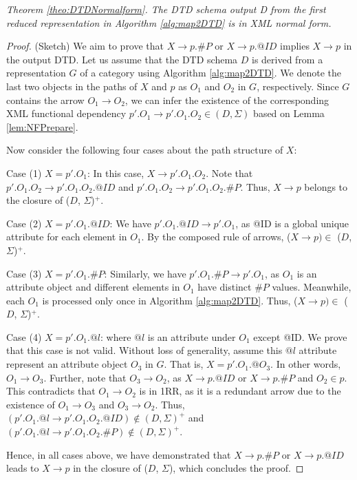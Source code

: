 \noindent \textit{Theorem \ref{theo:DTDNormalform}. The DTD schema output D from the first reduced representation in Algorithm \ref{alg:map2DTD}  is in XML normal form.}


\begin{proof}
(Sketch) We aim to prove that $X \to p.\#P$ or $X \to p.@ID$ implies $X \to p$ in the output DTD.
Let us assume that the DTD schema $D$ is derived from a representation $G$ of a category using Algorithm \ref{alg:map2DTD}. We denote the last two objects in the paths of $X$ and $p$ as $O_1$ and $O_2$ in $G$, respectively. Since $G$ contains the arrow $O_1 \to O_2$, we can infer the existence of the corresponding XML functional dependency $p'.O_1 \to p'.O_1.O_2 \in (D, \Sigma)$ based on Lemma \ref{lem:NFPrepare}.

Now consider the following four cases about the path structure of $X$:


Case (1) $X= p'.O_1$: In this case, $X \to p'.O_1.O_2$. Note that  $p'.O_1.O_2 \to p'.O_1.O_2.@ID$ and  $p'.O_1.O_2 \to p'.O_1.O_2.\#P$. Thus, $X \to p$ belongs to the closure of ($D$, $\Sigma$)$^+$.

Case (2) $X= p'.O_1.@ID$: We have $p'.O_1.@ID \to p'.O_1$, as @ID is a global unique attribute for each element in $O_1$. By the composed rule of arrows,  ($X \to p) \in$ ($D$, $\Sigma$)$^+$.

Case (3) $X= p'.O_1.\#P$: Similarly, we have $ p'.O_1.\#P \to p'.O_1$, as $O_1$ is an attribute object and  different elements in $O_1$ have distinct \#$P$ values. Meanwhile, each $O_1$ is processed only once in Algorithm \ref{alg:map2DTD}. Thus, ($X \to p) \in$ ($D$, $\Sigma$)$^+$.

Case (4) $X= p'.O_1.@l$: where $@l$ is an attribute under $O_1$ except @ID.  We prove that this case is not valid. Without loss of generality, assume this $@l$ attribute represent an attribute object $O_3$ in $G$.  That is, $X= p'.O_1.@O_3$. In other words, $O_1 \to O_3$. Further, note that $O_3 \to O_2$, as $X \to p.@ID$ or $X \to p.\#P$ and $O_2 \in p$. This contradicts that $O_1 \to O_2$ is in 1RR, as it is a redundant arrow due to the existence of $O_1 \to O_3$ and $O_3 \to O_2$.   Thus, 
$ (p'.O_1.@l \to p'.O_1.O_2.@ID) \notin (D,\Sigma)^+$ and $ (p'.O_1.@l \to p'.O_1.O_2.\#P) \notin (D,\Sigma)^+$.


Hence, in all cases above,  we have demonstrated that $X \to p.\#P$ or $X \to p.@ID$ leads to $X \to p$ in the closure of ($D$, $\Sigma$), which concludes the proof.
\end{proof}

